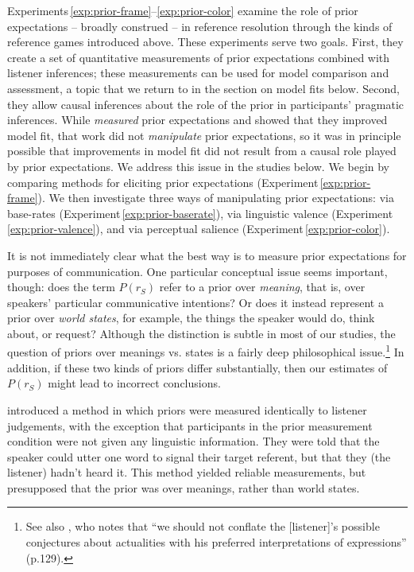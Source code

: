 \documentclass[man,noapacite]{apa2}
\newcounter{Experiment}
\newcommand{\exptref}[1]{Experiment\,\ref{#1}}
\newcommand{\exptrefrange}[2]{Experiments\,\ref{#1}--\ref{#2}}
\begin{document}
\exptrefrange{exp:prior-frame}{exp:prior-color} examine the role of prior expectations -- broadly construed -- in reference resolution through the kinds of reference games introduced above. These experiments serve two goals. First, they create a set of quantitative measurements of prior expectations combined with listener inferences; these measurements can be used for model comparison and assessment, a topic that we return to in the section on model fits below. Second, they allow causal inferences about the role of the prior in participants' pragmatic inferences. While  \emph{measured} prior expectations and showed that they improved model fit, that work did not \emph{manipulate} prior expectations, so it was in principle possible that improvements in model fit did not result from a causal role played by prior expectations. We address this issue in the studies below. We begin by comparing methods for eliciting prior expectations (\exptref{exp:prior-frame}). We then investigate three ways of manipulating prior expectations: via base-rates (\exptref{exp:prior-baserate}), via linguistic valence (\exptref{exp:prior-valence}), and via perceptual salience (\exptref{exp:prior-color}).

It is not immediately clear what the best way is to measure prior expectations for purposes of communication. One particular conceptual issue seems important, though: does the term $P(r_S)$ refer to a prior over \emph{meaning}, that is, over speakers' particular communicative intentions? Or does it instead represent a prior over \emph{world states}, for example, the things the speaker would do, think about, or request? Although the distinction is subtle in most of our studies, the question of priors over meanings vs. states is a fairly deep philosophical issue.\footnote{See also , who notes that ``we should not conflate the [listener]’s possible conjectures about actualities with his preferred interpretations of expressions'' (p.129).}  In addition, if these two kinds of priors differ substantially, then our estimates of $P(r_S)$ might lead to incorrect conclusions.

 introduced a method in which priors were measured identically to listener judgements, with the exception that participants in the prior measurement condition were not given any linguistic information. They were told that the speaker could utter one word to signal their target referent, but that they (the listener) hadn't heard it. This method yielded reliable measurements, but presupposed that the prior was over meanings, rather than world states.
\end{document}

